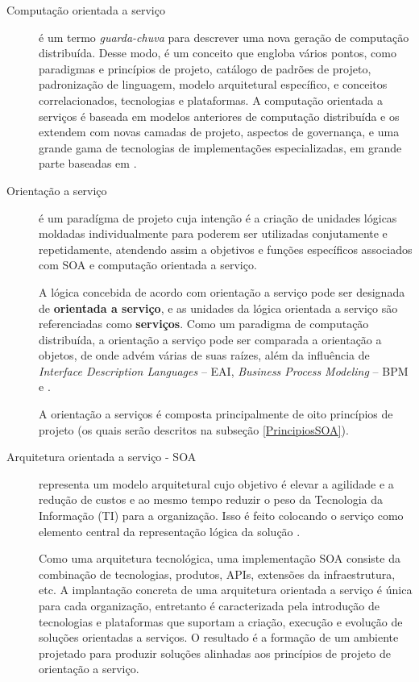 \begin{description}
\item [Computação orientada a serviço] é um termo \textit{guarda-chuva} para
descrever uma nova geração de computação distribuída. Desse modo, é um conceito
que engloba vários pontos, como paradigmas e princípios de projeto, catálogo de
padrões de projeto, padronização de linguagem, modelo arquitetural específico, e
conceitos correlacionados, tecnologias e plataformas.
A computação orientada a serviços é baseada em modelos anteriores de computação
distribuída e os extendem com novas camadas de projeto, aspectos de governança,
e uma grande gama de tecnologias de implementações especializadas, em grande
parte baseadas em \ws{} \cite{erl2009web}.

\item [Orientação a serviço] é um paradígma de projeto cuja intenção é a criação
de unidades lógicas moldadas individualmente para poderem ser utilizadas
conjutamente e repetidamente, atendendo assim a objetivos e
funções específicos associados com SOA e computação orientada a serviço.

A lógica concebida de acordo com orientação a serviço pode ser designada de
\textbf{orientada a serviço}, e as unidades da lógica orientada a serviço são
referenciadas como \textbf{serviços}. Como um paradigma de computação
distribuída, a orientação a serviço pode ser comparada a orientação a objetos,
de onde advém várias de suas raízes, além da influência de
\textit{Interface Description Languages} -- EAI,
\textit{Business Process Modeling} -- BPM e \ws \cite{erl2009web}.

A orientação a serviços é composta principalmente de oito princípios de projeto
(os quais serão descritos na subseção \ref{PrincipiosSOA}).

\item [Arquitetura orientada a serviço - SOA] representa um modelo arquitetural
cujo objetivo é elevar a agilidade e a redução de custos e ao mesmo tempo
reduzir o peso da Tecnologia da Informação (TI) para a organização. Isso é feito
colocando o serviço como elemento central da representação lógica da solução \cite{erl2009web}.

Como uma arquitetura tecnológica, uma implementação SOA consiste da combinação
de tecnologias, produtos, APIs, extensões da infraestrutura, etc. A implantação
concreta de uma arquitetura orientada a serviço é única para cada organização,
entretanto é caracterizada pela introdução de tecnologias e plataformas que
suportam a criação, execução e evolução de soluções orientadas a serviços. O
resultado é a formação de um ambiente projetado para produzir soluções alinhadas
aos princípios de projeto de orientação a serviço.


\end{description}
